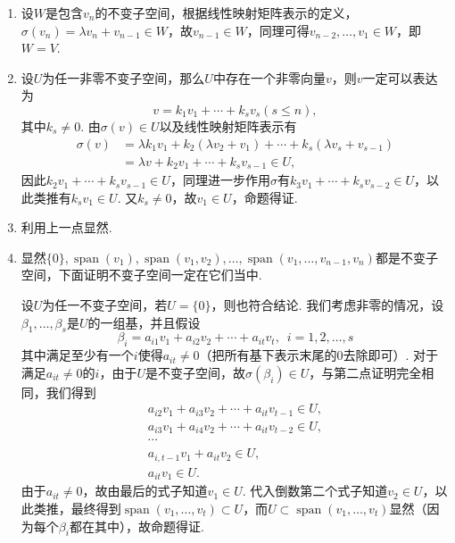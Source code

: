 \documentclass[12pt,fontset=fandol]{ctexart}
\begin{document}
\begin{solve}
\begin{enumerate}
        \item 设$W$是包含$v_n$的不变子空间，根据线性映射矩阵表示的定义，$\sigma(v_n)=\lambda v_n+v_{n-1}\in W$，故$v_{n-1}\in W$，同理可得$v_{n-2},\ldots,v_1\in W$，即$W=V$.

        \item 设$U$为任一非零不变子空间，那么$U$中存在一个非零向量$v$，则$v$一定可以表达为
              \[v=k_1v_1+\cdots+k_sv_s(s\leqslant n),\]
              其中$k_s\neq 0$. 由$\sigma(v)\in U$以及线性映射矩阵表示有
              \begin{align*}
                  \sigma(v) & = \lambda k_1v_1+k_2(\lambda v_2+v_1)+\cdots+k_s(\lambda v_s+v_{s-1}) \\
                            & = \lambda v+k_2v_1+\cdots+k_sv_{s-1}\in U,
              \end{align*}
              因此$k_2v_1+\cdots+k_sv_{s-1}\in U$，同理进一步作用$\sigma$有$k_3v_1+\cdots+k_sv_{s-2}\in U$，以此类推有$k_sv_1\in U$. 又$k_s\neq 0$，故$v_1\in U$，命题得证.

        \item 利用上一点显然.

        \item 显然$\{0\},\operatorname{span}(v_1),\operatorname{span}(v_1,v_2),\ldots,\operatorname{span}(v_1,\ldots,v_{n-1},v_n)$都是不变子空间，下面证明不变子空间一定在它们当中.

              设$U$为任一不变子空间，若$U=\{0\}$，则也符合结论. 我们考虑非零的情况，设$\beta_1,\ldots,\beta_s$是$U$的一组基，并且假设
              \[\beta_i=a_{i1}v_1+a_{i2}v_2+\cdots+a_{it}v_t,\enspace i=1,2,\ldots,s\]
              其中满足至少有一个$i$使得$a_{it}\neq 0$（把所有基下表示末尾的0去除即可）. 对于满足$a_{it}\neq 0$的$i$，由于$U$是不变子空间，故$\sigma(\beta_i)\in U$，与第二点证明完全相同，我们得到
              \begin{align*}
                  a_{i2}v_1+a_{i3}v_2+\cdots+a_{it}v_{t-1}\in U, \\
                  a_{i3}v_1+a_{i4}v_2+\cdots+a_{it}v_{t-2}\in U, \\
                  \cdots                                         \\
                  a_{i,t-1}v_1+a_{it}v_2\in U,                   \\
                  a_{it}v_1\in U.
              \end{align*}
              由于$a_{it}\neq 0$，故由最后的式子知道$v_1\in U$. 代入倒数第二个式子知道$v_2\in U$，以此类推，最终得到$\operatorname{span}(v_1,\ldots,v_t)\subset U$，而$U\subset\operatorname{span}(v_1,\ldots,v_t)$显然（因为每个$\beta_i$都在其中），故命题得证.
    \end{enumerate}
\end{solve}
\end{document}
